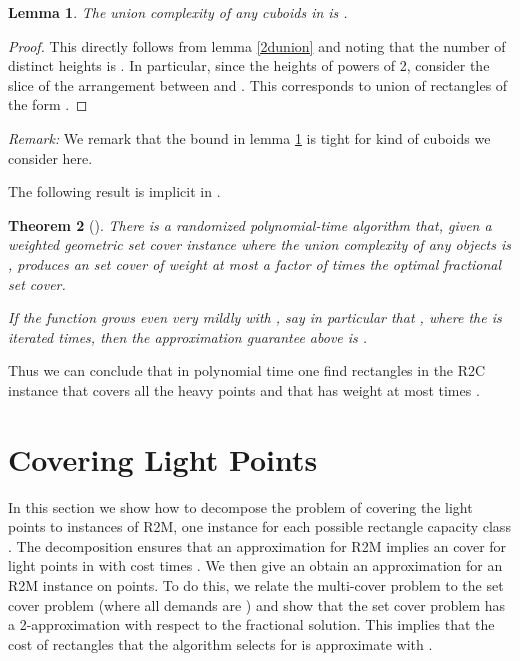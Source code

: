 \documentclass[11pt]{article}
\newtheorem{thm}{Theorem}
\newtheorem{lemma}[thm]{Lemma}
\begin{document}
\begin{lemma}
\label{3dunion}
The union complexity of any  cuboids in  is .
\end{lemma}
\begin{proof}
This directly follows from lemma \ref{2dunion} and noting that the number of distinct heights is . In particular, since the heights of powers of 2, consider the  slice of the arrangement between  and . This corresponds to union of rectangles of the form . 
\end{proof}

\noindent
{\em Remark:} We remark that the bound in lemma \ref{3dunion} is tight for kind of cuboids we consider here.

The following result  is implicit in \cite{Varadarajan10}.
\begin{thm} [\cite{Varadarajan10}]
There is a randomized polynomial-time algorithm that,
given a weighted geometric set cover instance 
where the union complexity of any  objects is ,
produces an set cover of weight at most a factor of  times the 
optimal fractional set cover.

If the function  grows even very mildly with , say in particular that , where the  is iterated  times, then the approximation guarantee above is .
\end{thm}


Thus we can conclude that in polynomial time one find rectangles
in the R2C instance  that 
covers all the heavy points and that has weight at most 
 times .





\section{Covering Light Points}
\label{sec:light}

In this section 
we show how to decompose the problem of covering the light 
points to  instances of R2M, one instance  for 
each possible rectangle capacity class . The decomposition ensures that an  approximation for R2M implies an cover for light points in  with cost 
 times .
We then give an obtain an  approximation for an R2M instance on  points. 
To do this, we relate the multi-cover 
problem to the set cover problem (where all demands are ) and show that the set cover problem has
a 2-approximation with respect to the fractional solution. 
This implies that the cost of rectangles that the algorithm selects for  is 
approximate with .
\end{document}
